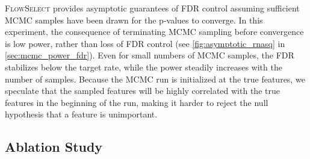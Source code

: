 \documentclass{article}
\newcommand{\FlowSelect}{\textsc{FlowSelect}\xspace}
\begin{document}
\FlowSelect provides asymptotic guarantees of FDR control assuming sufficient MCMC samples have been drawn for the p-values to converge.
In this experiment, the consequence of terminating MCMC sampling before convergence is low power, rather than loss of FDR control (see \cref{fig:asymptotic_rnasq} in \cref{sec:mcmc_power_fdr}).
Even for small numbers of MCMC samples, the FDR stabilizes below the target rate, while the power steadily increases with the number of samples.
Because the MCMC run is initialized at the true features,
we speculate that the sampled features will be highly correlated with the true features in the beginning of the run, making it harder to reject the null hypothesis that a feature is unimportant.

\subsection{Ablation Study} \label{sec:ablation_study}
\end{document}
